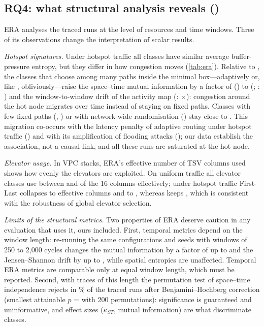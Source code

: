 \subsection{RQ4: what structural analysis reveals ()}
\label{sec:rq-structure}

ERA analyses the  traced runs at the level of resources and time windows. Three of its observations change the interpretation of scalar results.

\emph{Hotspot signatures.} Under hotspot traffic all classes have similar average buffer-pressure entropy, but they differ in how congestion moves (\cref{tab:era}). Relative to , the classes that choose among many paths inside the minimal box---adaptively or, like , obliviously---raise the space--time mutual information by a factor of  () to  (; : ) and the window-to-window drift of the activity map (: $\times$): congestion around the hot node migrates over time instead of staying on fixed paths. Classes with few fixed paths (, ) or with network-wide randomisation () stay close to . This migration co-occurs with the latency penalty of adaptive routing under hotspot traffic () and with its amplification of flooding attacks (); our data establish the association, not a causal link, and all these runs are saturated at the hot node.

\emph{Elevator usage.} In VPC stacks, ERA's effective number of TSV columns used shows how evenly the elevators are exploited. On uniform traffic all elevator classes use between  and  of the 16 columns effectively; under hotspot traffic First-Last collapses to  effective columns and  to , whereas  keeps , which is consistent with the robustness of global elevator selection.

\emph{Limits of the structural metrics.} Two properties of ERA deserve caution in any evaluation that uses it, ours included. First, temporal metrics depend on the window length: re-running the same configurations and seeds with windows of 250 to 2,000 cycles changes the mutual information by a factor of up to  and the Jensen--Shannon drift by up to , while spatial entropies are unaffected. Temporal ERA metrics are comparable only at equal window length, which must be reported. Second, with traces of this length the permutation test of space--time independence rejects in \% of the  traced runs after Benjamini--Hochberg correction (smallest attainable $p$ =  with 200 permutations): significance is guaranteed and uninformative, and effect sizes ($\kappa_{ST}$, mutual information) are what discriminate classes.

